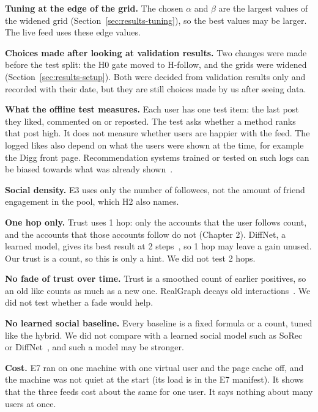 \textbf{Tuning at the edge of the grid.} The chosen $\alpha$ and $\beta$ are the largest values of the widened grid (Section~\ref{sec:results-tuning}), so the best values may be larger. The live feed uses these edge values.

\textbf{Choices made after looking at validation results.} Two changes were made before the test split: the H0 gate moved to H-follow, and the grids were widened (Section~\ref{sec:results-setup}). Both were decided from validation results only and recorded with their date, but they are still choices made by us after seeing data.

\textbf{What the offline test measures.} Each user has one test item: the last post they liked, commented on or reposted. The test asks whether a method ranks that post high. It does not measure whether users are happier with the feed. The logged likes also depend on what the users were shown at the time, for example the Digg front page. Recommendation systems trained or tested on such logs can be biased towards what was already shown~.

\textbf{Social density.} E3 uses only the number of followees, not the amount of friend engagement in the pool, which H2 also names.

\textbf{One hop only.} Trust uses 1 hop: only the accounts that the user follows count, and the accounts that those accounts follow do not (Chapter 2). DiffNet, a learned model, gives its best result at 2 steps~, so 1 hop may leave a gain unused. Our trust is a count, so this is only a hint. We did not test 2 hops.

\textbf{No fade of trust over time.} Trust is a smoothed count of earlier positives, so an old like counts as much as a new one. RealGraph decays old interactions~. We did not test whether a fade would help.

\textbf{No learned social baseline.} Every baseline is a fixed formula or a count, tuned like the hybrid. We did not compare with a learned social model such as SoRec~ or DiffNet~, and such a model may be stronger.

\textbf{Cost.} E7 ran on one machine with one virtual user and the page cache off, and the machine was not quiet at the start (its load is in the E7 manifest). It shows that the three feeds cost about the same for one user. It says nothing about many users at once.

